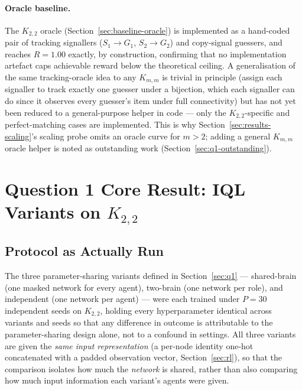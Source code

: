 \documentclass[a4paper,twoside,12pt]{report}
\begin{document}
\paragraph{Oracle baseline.} The $K_{2,2}$ oracle (Section~\ref{sec:baseline-oracle})
is implemented as a hand-coded pair of tracking signallers ($S_1 \to G_1$,
$S_2 \to G_2$) and copy-signal guessers, and reaches $R = 1.00$ exactly, by
construction, confirming that no implementation artefact caps achievable
reward below the theoretical ceiling. A generalisation of the same
tracking-oracle idea to any $K_{m,m}$ is trivial in principle (assign each
signaller to track exactly one guesser under a bijection, which each
signaller can do since it observes every guesser's item under full
connectivity) but has not yet been reduced to a general-purpose helper in
code --- only the $K_{2,2}$-specific and perfect-matching cases are
implemented. This is why Section~\ref{sec:results-scaling}'s scaling probe
omits an oracle curve for $m > 2$; adding a general $K_{m,m}$ oracle helper is
noted as outstanding work (Section~\ref{sec:q1-outstanding}).

\section{Question 1 Core Result: IQL Variants on \texorpdfstring{$K_{2,2}$}{K2,2}}
\label{sec:results-variants}

\subsection{Protocol as Actually Run}

The three parameter-sharing variants defined in Section~\ref{sec:q1} ---
shared-brain (one masked network for every agent), two-brain (one network per
role), and independent (one network per agent) --- were each trained under
$P = 30$ independent seeds on $K_{2,2}$, holding every hyperparameter
identical across variants and seeds so that any difference in outcome is
attributable to the parameter-sharing design alone, not to a confound in
settings. All three variants are given the \emph{same input representation}
(a per-node identity one-hot concatenated with a padded observation vector,
Section~\ref{sec:rl}), so that the comparison isolates how much the
\emph{network} is shared, rather than also comparing how much input
information each variant's agents were given.
\end{document}

